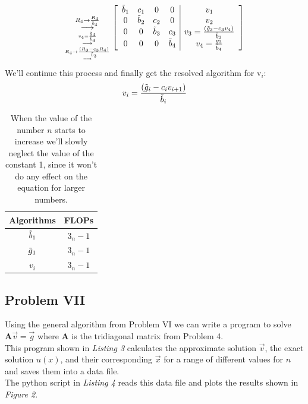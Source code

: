 \documentclass{article}
\begin{document}
\[
\underset{\underset{\overset{R_4\rightarrow\frac{(R_3-c_3R_4)}{\Tilde{b}_3}}{\longrightarrow}}{\overset{v_4=\frac{\Tilde{g}_4}{\Tilde{b}_4}}{\longrightarrow}}}{\overset{R_4\rightarrow\frac{R_4}{\Tilde{b}_4}}{\longrightarrow}}
\left[
\begin{array}{cccc|c}
    \Tilde{b}_1 & c_1 & 0 & 0 & v_1    \\
    0 & \Tilde{b}_2 & c_2 & 0 & v_2    \\
    0 & 0 & \Tilde{b}_3 & c_3 & v_3 =\frac{(\Tilde{g}_3-c_3v_4)}{\Tilde{b}_3}    \\
    0 & 0 & 0 & \Tilde{b}_4   & v_4 = \frac{\Tilde{g}_3}{\Tilde{b}_4}   \\
\end{array}
\right]
\]
We'll continue this process and finally get the resolved algorithm for v$_i$:
\begin{equation}\label{likn22}
    v_i = \frac{(\Tilde{g}_{i}-c_{i}v_{i+1})}{\Tilde{b}_i}
\end{equation}
\begin{table}[h!]
    \centering
    \begin{tabular}{|c|c|}
     \hline \hspace{1cm}Algorithms & \textbf{FLOPs}\hspace{1cm}  \\
     \hline $\Tilde{b}_1$ & 3$_n-1$\\ 
     \hline $\Tilde{g}_1$ & 3$_n-1$\\ 
     \hline $v_i$ &  3$_n-1$                                    \\
     \hline
    \end{tabular}
    \caption{When the value of the number $n$ starts to increase we'll slowly neglect the value of the constant 1, since it won't do any effect on the equation for larger numbers.}
    \label{Table1}
\end{table} 

\pagebreak
\subsection*{Problem VII}
Using the general algorithm from Problem VI we can write a program to solve 
$\mathbf{A}\Vec{v} = \Vec{g}$ where $\mathbf{A}$ is the tridiagonal matrix from Problem 4. \\

This program shown in \textit{Listing 3} calculates the approximate solution $\Vec{v}$, the 
exact solution $\mathbin{u(x)}$, and their corresponding $\Vec{x}$ for a range of different values for $\mathbin{n}$ and saves them into a data file. \\
The python script in \textit{Listing 4} reads this data file and plots the results shown 
in \textit{Figure 2}. \\ 
\end{document}
